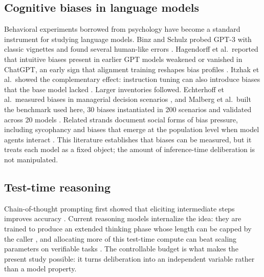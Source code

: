 \documentclass[conference]{IEEEtran}
\begin{document}
\subsection{Cognitive biases in language models}
Behavioral experiments borrowed from psychology have become a standard instrument for studying language models. Binz and Schulz probed GPT-3 with classic vignettes and found several human-like errors \cite{binz2023using}. Hagendorff et al.\ reported that intuitive biases present in earlier GPT models weakened or vanished in ChatGPT, an early sign that alignment training reshapes bias profiles \cite{hagendorff2023human}. Itzhak et al.\ showed the complementary effect: instruction tuning can also introduce biases that the base model lacked \cite{itzhak2024instructed}. Larger inventories followed. Echterhoff et al.\ measured biases in managerial decision scenarios \cite{echterhoff2024cognitive}, and Malberg et al.\ built the benchmark used here, 30 biases instantiated in 200 scenarios and validated across 20 models \cite{malberg2024comprehensive}. Related strands document social forms of bias pressure, including sycophancy \cite{sharma2024towards, fanous2025syceval} and biases that emerge at the population level when model agents interact \cite{ashery2025emergent}. This literature establishes that biases can be measured, but it treats each model as a fixed object; the amount of inference-time deliberation is not manipulated.

\subsection{Test-time reasoning}
Chain-of-thought prompting first showed that eliciting intermediate steps improves accuracy \cite{wei2022chain}. Current reasoning models internalize the idea: they are trained to produce an extended thinking phase whose length can be capped by the caller \cite{jaech2024openai, guo2025deepseek, yang2025qwen3}, and allocating more of this test-time compute can beat scaling parameters on verifiable tasks \cite{snell2024scaling, muennighoff2025s1}. The controllable budget is what makes the present study possible: it turns deliberation into an independent variable rather than a model property.
\end{document}
